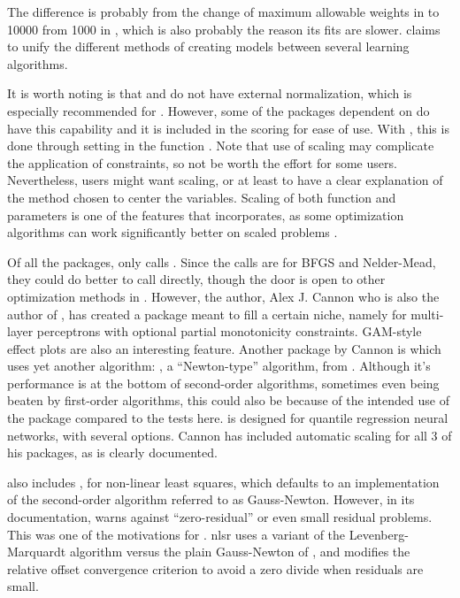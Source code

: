 The difference is probably from the change of maximum allowable weights
in  to 10000 from 1000 in , which is also
probably the reason its fits are slower. 
\citep{R-traineR} claims to unify the different methods of creating
models between several learning algorithms.

It is worth noting is that  and  do not
have external normalization, which is especially recommended for
 . However, some of the packages dependent on
 do have this capability and it is included in the scoring
for ease of use. With , this is done through setting
 in the function . Note that use of
scaling may complicate the application of constraints, so not be worth
the effort for some users. Nevertheless, users might want scaling, or at
least to have a clear explanation of the method chosen to center the
variables. Scaling of both function and parameters is one of the
features that  \citep{R-optimx} incorporates, as some
optimization algorithms can work significantly better on scaled problems
\citep{Nash-nlpor14}.

Of all the packages, only  \citep{R-monmlp} calls
. Since the calls are for BFGS and Nelder-Mead, they
could do better to call  directly, though the door is open
to other optimization methods in . However, the author,
Alex J. Cannon who is also the author of , has created
a package meant to fill a certain niche, namely for multi-layer
perceptrons with optional partial monotonicity constraints. GAM-style
effect plots are also an interesting feature. Another package by Cannon
is  \citep{R-qrnn} which uses yet another algorithm:
, a ``Newton-type'' algorithm, from . Although
it's performance is at the bottom of second-order algorithms, sometimes
even being beaten by first-order algorithms, this could also be because
of the intended use of the package compared to the tests here.
 is designed for quantile regression neural networks, with
several options. Cannon has included automatic scaling for all 3 of his
packages, as is clearly documented.

 also includes , for non-linear least squares,
which defaults to an implementation of the second-order algorithm
referred to as Gauss-Newton. However, in its documentation, 
warns against ``zero-residual'' or even small residual problems.
\citep[Section 6.4.1]{Nash-nlpor14} This was one of the motivations for
 \citep{R-nlsr}. nlsr uses a variant \citep{jn77ima} of
the Levenberg-Marquardt algorithm versus the plain Gauss-Newton of
, and modifies the relative offset convergence criterion to
avoid a zero divide when residuals are small.

